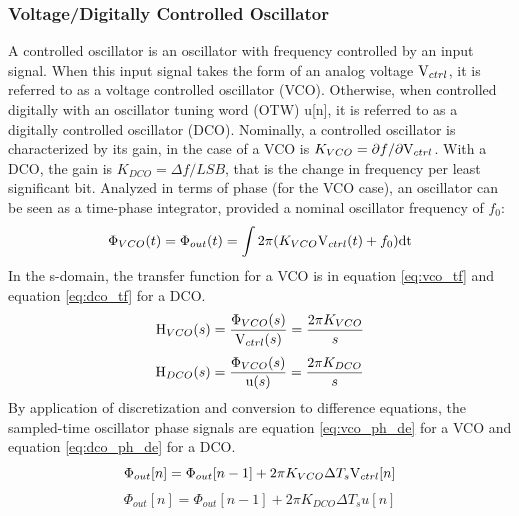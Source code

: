 		\subsubsection{Voltage/Digitally Controlled Oscillator}
			A controlled oscillator is an oscillator with frequency controlled by an input signal. When this input signal takes the form of an analog voltage $\textnormal{V}_{ctrl}$, it is referred to as a voltage controlled oscillator (VCO). Otherwise, when controlled digitally with an oscillator tuning word (OTW) u[n], it is referred to as a digitally controlled oscillator (DCO). Nominally, a controlled oscillator is characterized by its gain, in the case of a VCO is $K_{VCO} = \partial f/\partial \textnormal{V}_{ctrl}$. With a DCO, the gain is $K_{DCO} = \Delta f/LSB$, that is the change in frequency per least significant bit. Analyzed in terms of phase (for the VCO case), an oscillator can be seen as a time-phase integrator, provided a nominal oscillator frequency of $f_0$:
			\begin{equation}\label{eq:vco_ph}
				\Phi_{VCO}(t) = \Phi_{out}(t) = \int2\pi(K_{VCO}\textnormal{V}_{ctrl}(t) + f_0)\mathrm{dt}
			\end{equation}
			In the s-domain, the transfer function for a VCO is in equation \ref{eq:vco_tf} and equation \ref{eq:dco_tf} for a DCO. 
			\begin{equation}\label{eq:vco_tf}
				\mathrm{H}_{VCO}(s) = \frac{\Phi_{VCO}(s)}{\textnormal{V}_{ctrl}(s)} = \frac{2\pi K_{VCO}}{s}
			\end{equation}
			\begin{equation}\label{eq:dco_tf}
				\mathrm{H}_{DCO}(s) = \frac{\Phi_{VCO}(s)}{\textnormal{u}(s)} =  \frac{2\pi K_{DCO}}{s}
			\end{equation}
			By application of discretization and conversion to difference equations, the sampled-time oscillator phase signals are equation \ref{eq:vco_ph_de} for a VCO and equation \ref{eq:dco_ph_de} for a DCO. 
			\begin{equation}\label{eq:vco_ph_de}
				\Phi_{out}[n] = \Phi_{out}[n-1] + 2\pi K_{VCO}\Delta T_s\textnormal{V}_{ctrl}[n]
			\end{equation}
			\begin{equation}\label{eq:dco_ph_de}
				\Phi_{out}[n] = \Phi_{out}[n-1] + 2\pi K_{DCO}\Delta T_su[n]
			\end{equation}

